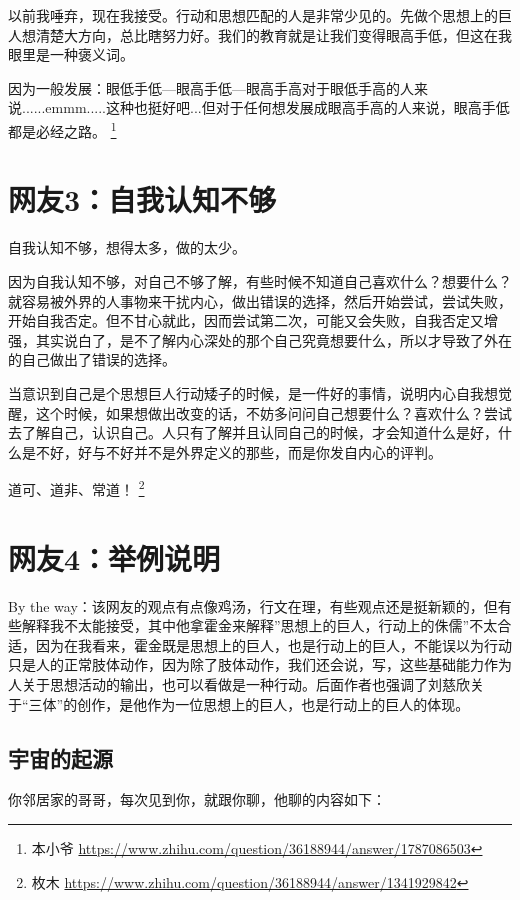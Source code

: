 以前我唾弃，现在我接受。行动和思想匹配的人是非常少见的。先做个思想上的巨人想清楚大方向，总比瞎努力好。我们的教育就是让我们变得眼高手低，但这在我眼里是一种褒义词。

因为一般发展：眼低手低—眼高手低—眼高手高对于眼低手高的人来说......emmm.....这种也挺好吧...但对于任何想发展成眼高手高的人来说，眼高手低都是必经之路。
\footnote{本小爷 \quad \url{https://www.zhihu.com/question/36188944/answer/1787086503}}

\section{网友3：自我认知不够}

自我认知不够，想得太多，做的太少。

因为自我认知不够，对自己不够了解，有些时候不知道自己喜欢什么？想要什么？就容易被外界的人事物来干扰内心，做出错误的选择，然后开始尝试，尝试失败，开始自我否定。但不甘心就此，因而尝试第二次，可能又会失败，自我否定又增强，其实说白了，是不了解内心深处的那个自己究竟想要什么，所以才导致了外在的自己做出了错误的选择。

当意识到自己是个思想巨人行动矮子的时候，是一件好的事情，说明内心自我想觉醒，这个时候，如果想做出改变的话，不妨多问问自己想要什么？喜欢什么？尝试去了解自己，认识自己。人只有了解并且认同自己的时候，才会知道什么是好，什么是不好，好与不好并不是外界定义的那些，而是你发自内心的评判。

道可、道非、常道！
\footnote{枚木 \quad \url{https://www.zhihu.com/question/36188944/answer/1341929842}}

\section{网友4：举例说明}

By the way：该网友的观点有点像鸡汤，行文在理，有些观点还是挺新颖的，但有些解释我不太能接受，其中他拿霍金来解释”思想上的巨人，行动上的侏儒”不太合适，因为在我看来，霍金既是思想上的巨人，也是行动上的巨人，不能误以为行动只是人的正常肢体动作，因为除了肢体动作，我们还会说，写，这些基础能力作为人关于思想活动的输出，也可以看做是一种行动。后面作者也强调了刘慈欣关于“三体”的创作，是他作为一位思想上的巨人，也是行动上的巨人的体现。

\subsection{宇宙的起源}

你邻居家的哥哥，每次见到你，就跟你聊，他聊的内容如下：

